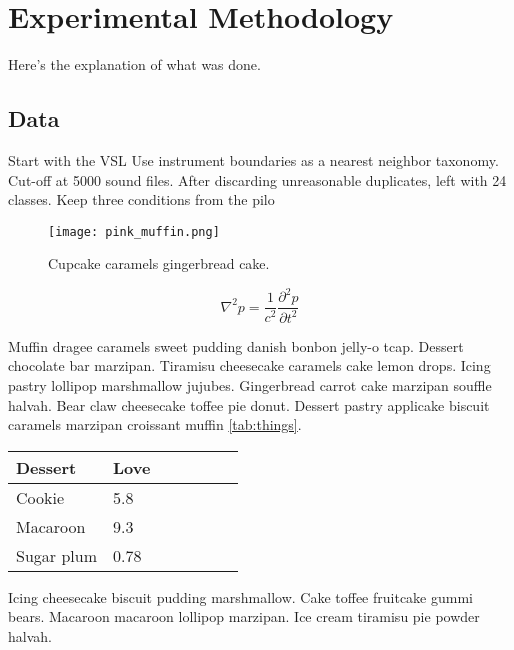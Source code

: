 \section{Experimental Methodology}
\label{sec:example}

Here's the explanation of what was done.

\subsection{Data}
Start with the VSL
Use instrument boundaries as a nearest neighbor taxonomy.
Cut-off at 5000 sound files.
After discarding unreasonable duplicates, left with 24 classes.
Keep three conditions from the pilo

\begin{figure}[h]
\centering
\texttt{[image: pink\_muffin.png]}
\caption{Cupcake caramels gingerbread cake.}
\label{fig:muffin}
\end{figure}


\begin{equation}
\nabla^2p = \frac{1}{c^2} \frac{\partial^2 p}{\partial t^2}
\label{eq:wave}
\end{equation}

Muffin dragee caramels sweet pudding danish bonbon jelly-o \gls{tcap}.
Dessert chocolate bar marzipan.
Tiramisu cheesecake caramels cake lemon drops. Icing pastry lollipop marshmallow jujubes.
Gingerbread carrot cake marzipan souffle halvah. Bear claw cheesecake toffee pie donut.
Dessert pastry applicake biscuit caramels marzipan croissant muffin \ref{tab:things}.

\begin{table*}[h]
\begin{center}
\caption{Halvah danish liquorice sesame snaps}
\begin{tabular}{l l l l l l l}
Dessert & Love \\
\hline
Cookie & 5.8\\
Macaroon & 9.3\\
Sugar plum & 0.78\\
\hline
\end{tabular}
\label{tab:things}
\end{center}
\end{table*}


\noindent
Icing cheesecake biscuit pudding marshmallow.
Cake toffee fruitcake gummi bears.
Macaroon macaroon lollipop marzipan.
Ice cream tiramisu pie powder halvah.








